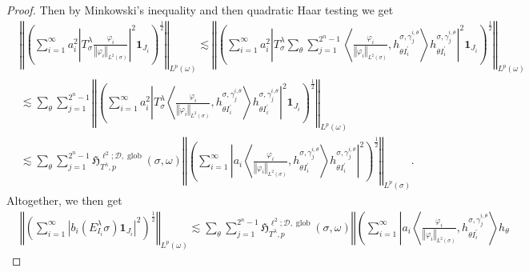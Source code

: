 \documentclass{amsart}%
\theoremstyle{plain}
\numberwithin{equation}{section}
\begin{document}
\begin{proof}
Then by Minkowski's inequality and then quadratic Haar testing we get
\begin{align*}
&  \left\Vert \left(  \sum_{i=1}^{\infty}a_{i}^{2}\left\vert T_{\sigma
}^{\lambda}\frac{\varphi_{i}}{\left\Vert \varphi_{i}\right\Vert _{L^{2}\left(
\sigma\right)  }}\right\vert ^{2}\mathbf{1}_{J_{i}}\right)  ^{\frac{1}{2}%
}\right\Vert _{L^{p}\left(  \omega\right)  }\lesssim\left\Vert \left(
\sum_{i=1}^{\infty}a_{i}^{2}\left\vert T_{\sigma}^{\lambda}\sum_{\theta}%
\sum\limits_{j=1}^{2^{n}-1}\left\langle \frac{\varphi_{i}}{\left\Vert
\varphi_{i}\right\Vert _{L^{2}\left(  \sigma\right)  }},h_{\theta
I_{i}^{\prime}}^{\sigma,\gamma_{j}^{i,\theta}}\right\rangle h_{\theta
I_{i}^{\prime}}^{\sigma,\gamma_{j}^{i,\theta}}\right\vert ^{2}\mathbf{1}%
_{J_{i}}\right)  ^{\frac{1}{2}}\right\Vert _{L^{p}\left(  \omega\right)  }\\
&  \lesssim\sum_{\theta}\sum\limits_{j=1}^{2^{n}-1}\left\Vert \left(
\sum_{i=1}^{\infty}a_{i}^{2}\left\vert T_{\sigma}^{\lambda}\left\langle
\frac{\varphi_{i}}{\left\Vert \varphi_{i}\right\Vert _{L^{2}\left(
\sigma\right)  }},h_{\theta I_{i}^{\prime}}^{\sigma,\gamma_{j}^{i,\theta}%
}\right\rangle h_{\theta I_{i}^{\prime}}^{\sigma,\gamma_{j}^{i,\theta}%
}\right\vert ^{2}\mathbf{1}_{J_{i}}\right)  ^{\frac{1}{2}}\right\Vert
_{L^{p}\left(  \omega\right)  }\\
&  \lesssim\sum_{\theta}\sum\limits_{j=1}^{2^{n}-1}\mathfrak{H}_{T^{\lambda
},p}^{\ell^{2};\mathcal{D},\operatorname*{glob}}\left(  \sigma,\omega\right)
\left\Vert \left(  \sum_{i=1}^{\infty}\left\vert a_{i}\left\langle
\frac{\varphi_{i}}{\left\Vert \varphi_{i}\right\Vert _{L^{2}\left(
\sigma\right)  }},h_{\theta I_{i}^{\prime}}^{\sigma,\gamma_{j}^{i,\theta}%
}\right\rangle h_{\theta I_{i}^{\prime}}^{\sigma,\gamma_{j}^{i,\theta}%
}\right\vert ^{2}\right)  ^{\frac{1}{2}}\right\Vert _{L^{p}\left(
\sigma\right)  }.
\end{align*}
Altogether, we then get%
\begin{align*}
&  \left\Vert \left(  \sum_{i=1}^{\infty}\left\vert b_{i}\left(  E_{I_{i}%
}^{\lambda}\sigma\right)  \mathbf{1}_{J_{i}}\right\vert ^{2}\right)
^{\frac{1}{2}}\right\Vert _{L^{p}\left(  \omega\right)  }\lesssim\sum_{\theta
}\sum\limits_{j=1}^{2^{n}-1}\mathfrak{H}_{T^{\lambda},p}^{\ell^{2}%
;\mathcal{D},\operatorname*{glob}}\left(  \sigma,\omega\right)  \left\Vert
\left(  \sum_{i=1}^{\infty}\left\vert a_{i}\left\langle \frac{\varphi_{i}%
}{\left\Vert \varphi_{i}\right\Vert _{L^{2}\left(  \sigma\right)  }},h_{\theta
I_{i}^{\prime}}^{\sigma,\gamma_{j}^{i,\theta}}\right\rangle h_{\theta
}
\end{align*}
\end{proof}
\end{document}
